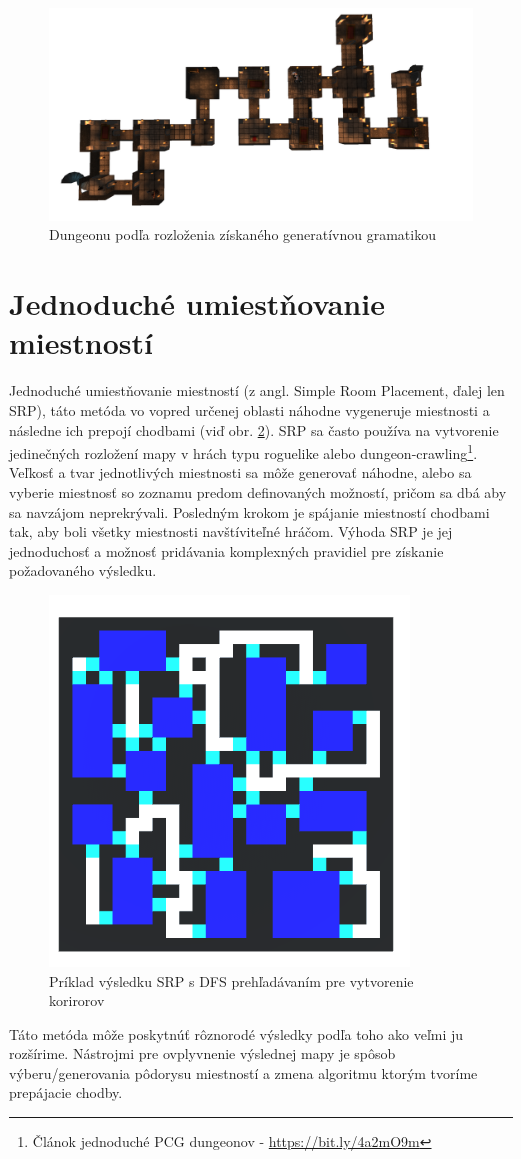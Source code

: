 \begin{figure}[H]
    \centering
    \includegraphics[width=0.4\linewidth]{obrazky-figures/gg-example.png}
    \caption{Dungeonu podľa rozloženia získaného generatívnou gramatikou \cite{van2013procedural}}
    \label{fig:ls-dungeon}
\end{figure}

\section{Jednoduché umiestňovanie miestností}

Jednoduché umiestňovanie miestností (z angl. Simple Room Placement, ďalej len SRP), táto metóda vo vopred určenej oblasti náhodne vygeneruje miestnosti a následne ich prepojí chodbami (viď obr. \ref{fig:srp}). SRP sa často používa na vytvorenie jedinečných rozložení mapy v hrách typu roguelike alebo dungeon-crawling\footnote{Článok jednoduché PCG dungeonov - \url{https://bit.ly/4a2mO9m}}.
Veľkosť a tvar jednotlivých miestnosti sa môže generovať náhodne, alebo sa vyberie miestnosť so zoznamu predom definovaných možností, pričom sa dbá aby sa navzájom neprekrývali. Posledným krokom je spájanie miestností chodbami tak, aby boli všetky miestnosti navštíviteľné hráčom. Výhoda SRP je jej jednoduchosť a možnosť pridávania komplexných pravidiel pre získanie požadovaného výsledku. 

\begin{figure}[H]
    \centering
    \includegraphics[width=0.3\linewidth]{obrazky-figures/srp-example.png}
    \caption{Príklad výsledku SRP s DFS prehľadávaním pre vytvorenie korirorov\footnotemark[13] }
    \label{fig:srp}
\end{figure}

Táto metóda môže poskytnúť rôznorodé výsledky podľa toho ako veľmi ju rozšírime. Nástrojmi pre ovplyvnenie výslednej mapy je spôsob výberu/generovania pôdorysu miestností a zmena algoritmu ktorým tvoríme prepájacie chodby.

